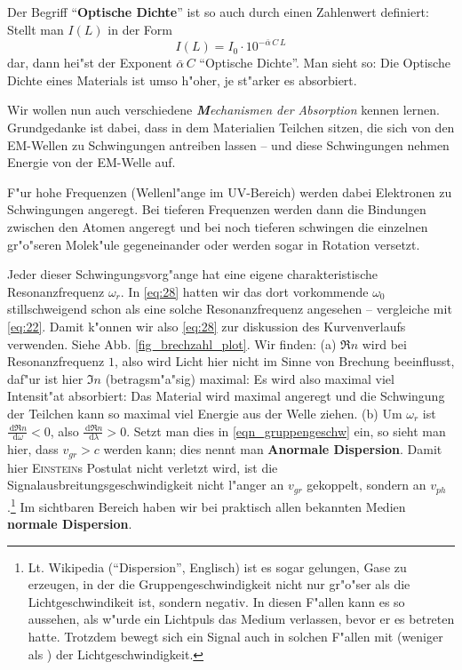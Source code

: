 \documentclass[twoside,a4paper]{book}
\newcommand{\st}[1]{{\slshape \textbf #1}}
\newcommand{\diff}{\ensuremath{\, \mathrm{d}}}
\newcommand{\abs}[0]{\bigskip \noindent}
\begin{document}
Der Begriff "`\textbf{Optische Dichte}"' ist so auch durch einen
Zahlenwert definiert: Stellt man $I(L)$ in der Form
\begin{equation*}
   I(L) = I_0 \cdot 10^{- \bar \alpha \, C \, L}
\end{equation*}
dar, dann hei"st der Exponent $\bar \alpha \, C$ "`Optische
Dichte"'. Man sieht so: Die Optische Dichte eines Materials ist umso
h"oher, je st"arker es absorbiert.



\abs
Wir wollen nun auch verschiedene \st{Mechanismen der Absorption}
kennen lernen. Grundgedanke ist dabei, dass in dem Materialien
Teilchen sitzen, die sich von den EM-Wellen zu Schwingungen antreiben
lassen -- und diese Schwingungen nehmen Energie von der EM-Welle auf.

F"ur hohe Frequenzen (Wellenl"ange im UV-Bereich) werden dabei
Elektronen zu Schwingungen angeregt. Bei tieferen Frequenzen werden
dann die Bindungen zwischen den Atomen angeregt und bei noch tieferen
schwingen die einzelnen gr"o"seren Molek"ule gegeneinander oder werden
sogar in Rotation versetzt. 

Jeder dieser Schwingungsvorg"ange hat eine eigene charakteristische
Resonanzfrequenz $\omega_r$. In \eqref{eq:28} hatten wir das dort
vorkommende $\omega_0$ stillschweigend schon als eine solche
Resonanzfrequenz angesehen -- vergleiche mit \eqref{eq:22}. Damit
k"onnen wir also \eqref{eq:28} zur diskussion des Kurvenverlaufs
verwenden. Siehe Abb. \ref{fig_brechzahl_plot}. Wir finden: (a) $\Re
n$ wird bei Resonanzfrequenz $1$, also wird Licht hier nicht im Sinne
von Brechung beeinflusst, daf"ur ist hier $\Im n$ (betragsm"a"sig)
maximal: Es wird also maximal viel Intensit"at absorbiert: Das
Material wird maximal angeregt und die Schwingung der Teilchen kann so
maximal viel Energie aus der Welle ziehen. (b) Um $\omega_r$ ist
$\frac{\diff \Re n}{\diff \omega} < 0$, also $\frac{\diff \Re n}{\diff
  \lambda} > 0$. Setzt man dies in \eqref{eqn_gruppengeschw} ein, so
sieht man hier, dass $v_{gr} > c$ werden kann; dies nennt man
\textbf{Anormale Dispersion}. Damit hier
\textsc{Einstein}s Postulat nicht verletzt wird, ist die
Signalausbreitungsgeschwindigkeit nicht l"anger an $v_{gr}$ gekoppelt,
sondern an $v_{ph}$.\footnote{Lt. Wikipedia ("`Dispersion"', Englisch)
ist es sogar gelungen, Gase zu erzeugen, in der die
Gruppengeschwindigkeit nicht nur gr"o"ser als die Lichtgeschwindikeit
ist, sondern negativ. In diesen F"allen kann es so aussehen, als
w"urde ein Lichtpuls das Medium verlassen, bevor er es betreten
hatte. Trotzdem bewegt sich ein Signal auch in solchen F"allen mit
(weniger als ) der Lichtgeschwindigkeit.} Im sichtbaren Bereich haben
wir bei praktisch allen bekannten Medien \textbf{normale Dispersion}.
\end{document}
